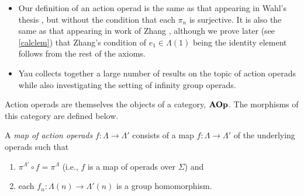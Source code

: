 \begin{rem}
\begin{itemize}
  \begin{center}
  \end{center}
\item Our definition of an action operad is the same as that appearing in Wahl's thesis \cite{wahl-thesis}, but without the condition that each $\pi_{n}$ is surjective. It is also the same as that appearing in work of Zhang \cite{zhang-grp}, although we prove later (see \cref{calclem}) that Zhang's condition of $e_{1} \in \Lambda(1)$ being the identity element follows from the rest of the axioms.
\item Yau \cite{yau_infinity_2021} collects together a large number of results on the topic of action operads while also investigating the setting of infinity group operads. 
\end{itemize}
\end{rem}

Action operads are themselves the objects of a category, $\mathbf{AOp}$. The morphisms of this category are defined below.
\begin{Defi}\label{mapaop}
A \textit{map of action operads} $f \colon  \Lambda \rightarrow \Lambda'$ consists of a map $f \colon \Lambda \rightarrow \Lambda'$ of the underlying operads such that
  \begin{enumerate}
    \item $\pi^{\Lambda'} \circ f = \pi^{\Lambda}$ (i.e., $f$ is a map of operads over $\Sigma$) and
    \item each $f_{n} \colon \Lambda(n) \rightarrow \Lambda'(n)$ is a group homomorphism.
  \end{enumerate}
\end{Defi}

